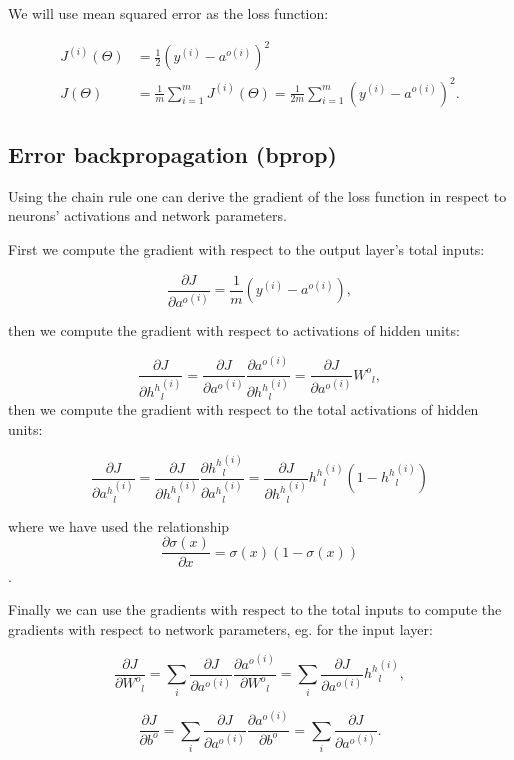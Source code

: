 \documentclass[]{article}
\theoremstyle{definition}
\begin{document}
We will use mean squared error as the loss function:

\begin{equation}
\begin{split}
J^{(i)}(\Theta) &= \frac{1}{2} \left( y^{(i)}- a^{o{(i)}}  \right)  ^2 \\
J(\Theta) &= \frac{1}{m}\sum_{i=1}^m J^{(i)}(\Theta)= \frac{1}{2m}\sum_{i=1}^m \left( y^{(i)}- a^{o{(i)}}  \right)  ^2  .
\end{split}
\end{equation}


\subsection{Error backpropagation (bprop)}

Using the chain rule one can derive the gradient of the loss function
in respect to neurons' activations and network parameters.


First we compute the gradient with respect to the output layer's
total inputs:

\begin{equation}
\frac{\partial J}{\partial {a^o}^{(i)}} = \frac{1}{m} \left( y^{(i)}- a^{o{(i)}}  \right),
\end{equation}

then we compute the gradient with respect to activations of hidden units:

\begin{equation}
\frac{\partial J}{\partial {h^h}^{(i)}_l} = \frac{\partial J}{\partial {a^o}^{(i)}} \frac{\partial {a^o}^{(i)}}{\partial {h^h}^{(i)}_l} =  \frac{\partial J}{\partial {a^o}^{(i)}} {W^o}_{l},
\end{equation}
then we compute the gradient with respect to the total activations of hidden units:

\begin{equation}
\frac{\partial J}{\partial {a^h}^{(i)}_l} = \frac{\partial J}{\partial {h^h}^{(i)}_l}\frac{\partial {h^h}^{(i)}_l}{\partial {a^h}^{(i)}_l} = \frac{\partial J}{\partial {h^h}^{(i)}_l} {h^h}^{(i)}_l(1-{h^h}^{(i)}_l) 
\end{equation}

where we have used the relationship
$$\frac{\partial \sigma(x)}{\partial x} = \sigma(x)(1-\sigma(x))$$	.


Finally we can use the gradients with respect to the total inputs to
compute the gradients with respect to network parameters,
eg. for the input layer:

\begin{equation}
\frac{\partial J}{\partial {W^o}_{l}} = \sum_{i}\frac{\partial J}{\partial {a^o}^{(i)}}\frac{\partial {a^o}^{(i)}}{\partial {W^o}_{l}} = \sum_{i}\frac{\partial J}{\partial {a^o}^{(i)}}{h^h}^{(i)}_l,
\end{equation}

\begin{equation}
\frac{\partial J}{\partial {b^o}} = \sum_{i}\frac{\partial J}{\partial {a^o}^{(i)}}\frac{\partial {a^o}^{(i)}}{\partial {b^o}} = \sum_{i}\frac{\partial J}{\partial {a^o}^{(i)}}.
\end{equation}
\end{document}

